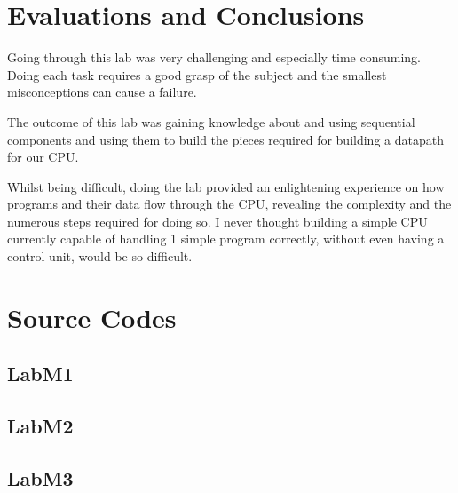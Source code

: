 \documentclass{article}
\begin{document}

\section{Evaluations and Conclusions}

Going through this lab was very challenging and especially time consuming.
Doing each task requires a good grasp of the subject and the smallest misconceptions
can cause a failure. \newline

The outcome of this lab was gaining knowledge about and using sequential
components and using them to build the pieces required for building a datapath
for our CPU. \newline

Whilst being difficult, doing the lab provided an enlightening experience on
how programs and their data flow through the CPU, revealing the complexity and
the numerous steps required for doing so. I never thought building a simple CPU
currently capable of handling 1 simple program correctly, without even having
a control unit, would be so difficult.


\pagebreak

\section{Source Codes}

\subsection{LabM1}


\pagebreak

\subsection{LabM2}


\pagebreak

\subsection{LabM3}

\end{document}
